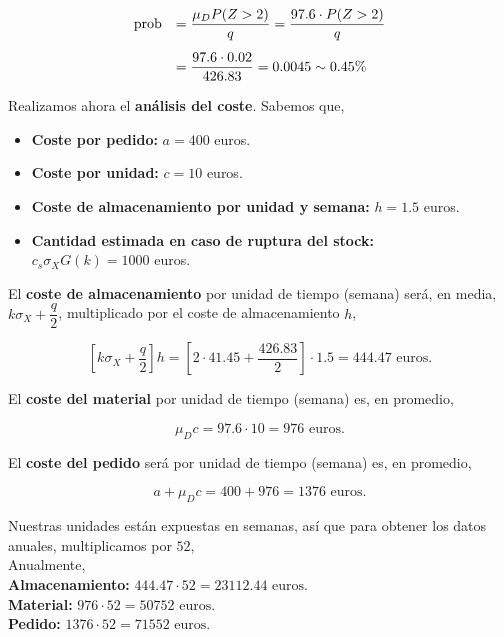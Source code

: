 \documentclass[a4paper,12pt]{article}
\begin{document}
\begin{equation*}
\begin{array}{l l}
\text{prob} & = \dfrac{\mu_D P(Z > 2)}{q} = \dfrac{97.6\cdot P(Z > 2)}{q}\\[.5cm]
\, & = \dfrac{97.6\cdot 0.02}{426.83} = 0.0045 \sim 0.45\%
\end{array}
\end{equation*}

\smallskip

Realizamos ahora el \textbf{an\'alisis del coste}. Sabemos que,

\begin{itemize}
\item[] \textbf{Coste por pedido:} $a = 400$ euros.
\item[] \textbf{Coste por unidad:} $c = 10$ euros.
\item[] \textbf{Coste de almacenamiento por unidad y semana:} $h = 1.5$ euros.

\item[] \textbf{Cantidad estimada en caso de ruptura del stock:} \\$c_s \sigma_X G(k) = 1000$ euros.
\end{itemize}

El \textbf{coste de almacenamiento} por unidad de tiempo (semana) ser\'a, en media, $k\sigma_X + \dfrac{q}{2}$, multiplicado por el coste de almacenamiento $h$,

$$ \left[k\sigma_X + \dfrac{q}{2}\right] h = \left[2\cdot 41.45 + \dfrac{426.83}{2} \right]\cdot 1.5 = 444.47\text{ euros.}$$

El \textbf{coste del material} por unidad de tiempo (semana) es, en promedio,

$$ \mu_D c = 97.6\cdot 10 = 976 \text{ euros.}$$

El \textbf{coste del pedido} ser\'a por unidad de tiempo (semana) es, en promedio,

$$ a + \mu_D c = 400 + 976 = 1376 \text{ euros.}$$

Nuestras unidades est\'an expuestas en semanas, as\'i que para obtener los datos anuales, multiplicamos por $52$,\\

Anualmente,\\


\textbf{Almacenamiento:} $444.47\cdot 52 =  23112.44 \text{ euros.}$\\
\textbf{Material:} $976\cdot 52 = 50752\text{ euros.}$\\
\textbf{Pedido:} $1376\cdot 52 = 71552\text{ euros.}$\\
\end{document}
